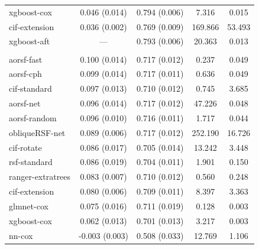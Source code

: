 \documentclass[twoside,11pt]{article}\usepackage[]{graphicx}\usepackage[]{xcolor}
\newenvironment{knitrout}{}{} %
\begin{document}
\begin{knitrout}
\begin{longtable}[t]{lcccc}
\hspace{1em}xgboost-cox & 0.046 (0.014) & 0.794 (0.006) & 7.316 & 0.015\\
\hspace{1em}cif-extension & 0.036 (0.002) & 0.769 (0.009) & 169.866 & 53.493\\
\hspace{1em}xgboost-aft & --- & 0.793 (0.006) & 20.363 & 0.013\\
\addlinespace[0.3em]
\multicolumn{5}{l}{\textit{\textbf{Colon cancer; death, n = 929, p = 12}}}\\
\hline
\hspace{1em}aorsf-fast & 0.100 (0.014) & 0.717 (0.012) & 0.237 & 0.049\\
\hspace{1em}aorsf-cph & 0.099 (0.014) & 0.717 (0.011) & 0.636 & 0.049\\
\hspace{1em}cif-standard & 0.097 (0.013) & 0.710 (0.012) & 0.745 & 3.685\\
\hspace{1em}aorsf-net & 0.096 (0.014) & 0.717 (0.012) & 47.226 & 0.048\\
\hspace{1em}aorsf-random & 0.096 (0.010) & 0.716 (0.011) & 1.717 & 0.044\\
\hspace{1em}obliqueRSF-net & 0.089 (0.006) & 0.717 (0.012) & 252.190 & 16.726\\
\hspace{1em}cif-rotate & 0.086 (0.017) & 0.705 (0.014) & 13.242 & 3.448\\
\hspace{1em}rsf-standard & 0.086 (0.019) & 0.704 (0.011) & 1.901 & 0.150\\
\hspace{1em}ranger-extratrees & 0.083 (0.007) & 0.710 (0.012) & 0.560 & 0.248\\
\hspace{1em}cif-extension & 0.080 (0.006) & 0.709 (0.011) & 8.397 & 3.363\\
\hspace{1em}glmnet-cox & 0.075 (0.016) & 0.711 (0.019) & 0.128 & 0.003\\
\hspace{1em}xgboost-cox & 0.062 (0.013) & 0.701 (0.013) & 3.217 & 0.003\\
\hspace{1em}nn-cox & -0.003 (0.003) & 0.508 (0.033) & 12.769 & 1.106\\

\end{longtable}
\end{knitrout}
\end{document}
